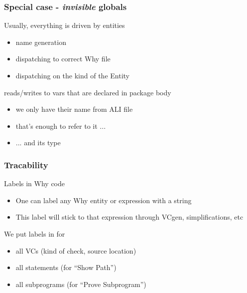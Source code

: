 \documentclass{beamer}
\newenvironment{specialframe}{%
  \begin{frame}[fragile,environment=specialframe]}{\end{frame}}
\begin{document}
\begin{specialframe}\frametitle{Special case - \emph{invisible} globals}
   \begin{block}{Usually, everything is driven by entities}
      \begin{itemize}
         \item name generation
         \item dispatching to correct Why file
         \item dispatching on the kind of the Entity
      \end{itemize}
   \end{block}
   \begin{block}{reads/writes to vars that are declared in package body}
      \begin{itemize}
         \item we only have their name from ALI file
         \item that's enough to refer to it ...
         \item ... and its type
      \end{itemize}
   \end{block}
\end{specialframe}

\begin{specialframe}\frametitle{Tracability}
   \begin{block}{Labels in Why code}
      \begin{itemize}
         \item One can label any Why entity or expression with a string
         \item This label will stick to that expression through VCgen,
         simplifications, etc
      \end{itemize}
   \end{block}
   \begin{block}{We put labels in for}
      \begin{itemize}
         \item all VCs (kind of check, source location)
         \item all statements (for ``Show Path'')
         \item all subprograms (for ``Prove Subprogram'')
      \end{itemize}
   \end{block}
\end{specialframe}
\end{document}
